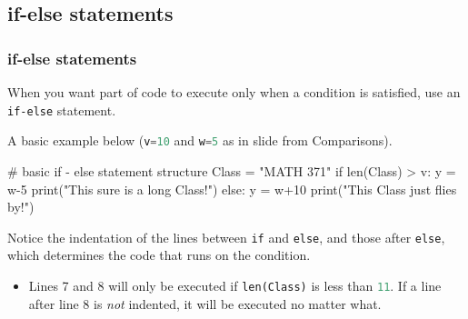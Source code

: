 \documentclass{beamer}
\newenvironment{codeblock}
    {\hfill\begin{beamerboxesrounded}[lower=codecol, width=0.8\textwidth]
    \medskip

    }
    { 
    \end{beamerboxesrounded}\hfill
    }
\theoremstyle{example}
\newcommand{\ct}[1]{\lstinline[language=Python]!#1!}
\newcommand{\ttt}[1]{{\small\texttt{#1}}}
\begin{document}
\subsection{if-else statements}
\begin{frame}[fragile]
\frametitle{{\ttm if-else} statements}

When you want part of code to execute only when a condition is satisfied, use an \ttt{if-else} statement. 

\pause
A basic example below (\ct{v=10} and \ct{w=5} as in slide from Comparisons).

\begin{codeblock}

\begin{python}
# basic if - else statement structure
Class = "MATH 371"
if len(Class) > v:
    y = w-5
    print("This sure is a long Class!")
else:
    y = w+10
    print("This Class just flies by!")
\end{python}

\end{codeblock}

\vspace*{12pt}

Notice the indentation of the lines between \ttt{if} and \ttt{else}, and those after \ttt{else}, which determines the code that runs on the condition. 
\pause
\begin{itemize}
	\item[] Lines 7 and 8 will only be executed if \ttt{len(Class)} is less than \ct{11}. If a line after line 8 is \emph{not} indented, it will be executed no matter what.
\end{itemize}

\end{frame}
\end{document}
